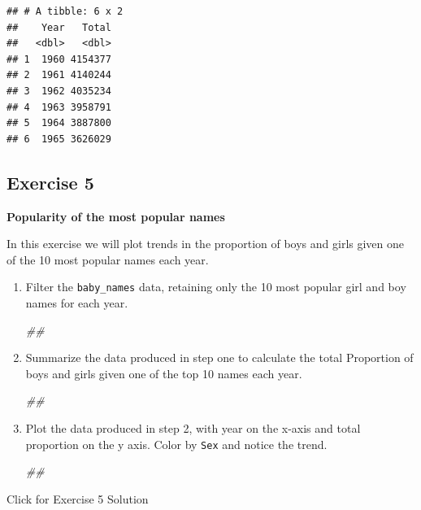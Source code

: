 \documentclass[
]{book}
\newenvironment{Shaded}{\begin{snugshade}}{\end{snugshade}}
\newcommand{\CommentTok}[1]{\textcolor[rgb]{0.56,0.35,0.01}{\textit{#1}}}
\begin{document}
\begin{verbatim}
## # A tibble: 6 x 2
##    Year   Total
##   <dbl>   <dbl>
## 1  1960 4154377
## 2  1961 4140244
## 3  1962 4035234
## 4  1963 3958791
## 5  1964 3887800
## 6  1965 3626029
\end{verbatim}

\hypertarget{exercise-5}{%
\subsection{Exercise 5}\label{exercise-5}}

\textbf{Popularity of the most popular names}

In this exercise we will plot trends in the proportion of boys and girls
given one of the 10 most popular names each year.

\begin{enumerate}
\def\labelenumi{\arabic{enumi}.}
\item
  Filter the \texttt{baby\_names} data, retaining only the 10 most popular girl
  and boy names for each year.

\begin{Shaded}
\begin{Highlighting}[]
\CommentTok{\#\#}
\end{Highlighting}
\end{Shaded}
\item
  Summarize the data produced in step one to calculate the total
  Proportion of boys and girls given one of the top 10 names
  each year.

\begin{Shaded}
\begin{Highlighting}[]
\CommentTok{\#\#}
\end{Highlighting}
\end{Shaded}
\item
  Plot the data produced in step 2, with year on the x-axis
  and total proportion on the y axis. Color by \texttt{Sex} and notice
  the trend.

\begin{Shaded}
\begin{Highlighting}[]
\CommentTok{\#\#}
\end{Highlighting}
\end{Shaded}
\end{enumerate}

{Click for Exercise 5 Solution}
\end{document}
